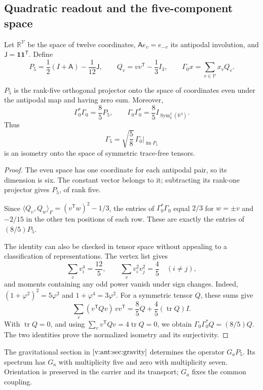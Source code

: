 \subsection{Quadratic readout and the five-component space}
Let \(\mathbb R^{\mathcal V}\) be the space of twelve coordinates,
\(\mathsf A e_v=e_{-v}\) its antipodal involution, and
\(\mathsf J=\mathbf1\mathbf1^{\mathsf T}\). Define
\[
 P_5=\frac12(I+\mathsf A)-\frac1{12}\mathsf J,\qquad
 Q_v=vv^{\mathsf T}-\frac13I_3,\qquad
 \Gamma_0x=\sum_{v\in\mathcal V}x_vQ_v.
\]
\begin{theorem}
\label{vii:thm:portador-pentacomponente}
\(P_5\) is the rank-five orthogonal projector onto the space of
coordinates even under the antipodal map and having zero sum. Moreover,
\[
 \Gamma_0^*\Gamma_0=\frac85P_5,\qquad
 \Gamma_0\Gamma_0^*=\frac85I_{\operatorname{Sym}^2_0(\mathbb R^3)}.
\]
Thus
\[
 \Gamma_5=\sqrt{\frac58}\,\Gamma_0|_{\operatorname{im}P_5}
\]
is an isometry onto the space of symmetric trace-free tensors.
\end{theorem}
\begin{proof}
The even space has one coordinate for each antipodal pair, so
its dimension is six. The constant vector belongs to it; subtracting its
rank-one projector gives \(P_5\), of rank five.

Since
\(\langle Q_v,Q_w\rangle_F=(v^{\mathsf T}w)^2-1/3\), the entries
of \(\Gamma_0^*\Gamma_0\) equal \(2/3\) for \(w=\pm v\) and
\(-2/15\) in the other ten positions of each row. These are
exactly the entries of \((8/5)P_5\).

The identity can also be checked in tensor space without
appealing to a classification of representations. The vertex list gives
\[
 \sum_vv_i^4=\frac{12}{5},\qquad
 \sum_vv_i^2v_j^2=\frac45\quad(i\ne j),
\]
and moments containing any odd power vanish under sign
changes. Indeed,
\((1+\varphi^2)^2=5\varphi^2\) and \(1+\varphi^4=3\varphi^2\).
For a symmetric tensor \(Q\), these sums give
\[
 \sum_v(v^{\mathsf T}Qv)\,vv^{\mathsf T}
 =\frac85Q+\frac45(\operatorname{tr}Q)I.
\]
With \(\operatorname{tr}Q=0\), and using
\(\sum_vv^{\mathsf T}Qv=4\operatorname{tr}Q=0\), we obtain
\(\Gamma_0\Gamma_0^*Q=(8/5)Q\). The two identities prove
the normalized isometry and its surjectivity.
\end{proof}

The gravitational section in \(\ref{v:ant:sec:gravity}\) determines the
operator \(G_aP_5\). Its spectrum has \(G_a\) with multiplicity
five and zero with multiplicity seven. Orientation is preserved in
the carrier and its transport; \(G_a\) fixes the common coupling.

